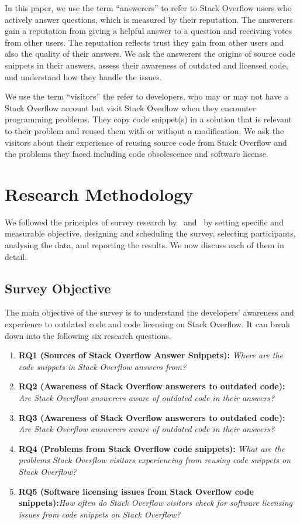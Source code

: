 \documentclass{svjour3}                     %
\begin{document}
In this paper, we use the term ``answerers'' to refer to Stack Overflow users
who actively answer questions, which is measured by their reputation. The
answerers gain a reputation from giving a helpful answer to a question and
receiving votes from other users. The reputation reflects trust they gain from
other users and also the quality of their answers. We ask the answerers the
origins of source code snippets in their answers, assess their awareness of
outdated and licensed code, and understand how they handle the issues.

We use the term ``visitors'' the refer to developers, who may or may not have a
Stack Overflow account but visit Stack Overflow when they encounter programming
problems. They copy code snippet(s) in a solution that is relevant to their
problem and reused them with or without a modification. We ask the visitors
about their experience of reusing source code from Stack Overflow and the problems
they faced including code obsolescence and software license.

\section{Research Methodology}
We followed the principles of survey research by~\cite{Pfleeger2001}
and~\cite{Kitchenham2002} by setting specific and measurable objective, 
designing and scheduling the survey, selecting participants, analysing the data, and reporting the results.
We now discuss each of them in detail.

\subsection{Survey Objective}
The main objective of the survey is to understand the developers' awareness and
experience to outdated code and code licensing on Stack Overflow. It can break
down into the following six research questions.

\begin{enumerate}
	\item \textbf{RQ1 (Sources of Stack Overflow Answer Snippets):} \textit{Where are the code snippets in Stack Overflow answers from?}
	\item \textbf{RQ2 (Awareness of Stack Overflow answerers to outdated code):} \textit{Are Stack Overflow answerers aware of outdated code in their answers?}
	\item \textbf{RQ3 (Awareness of Stack Overflow answerers to outdated code):} \textit{Are Stack Overflow answerers aware of outdated code in their answers?}
	\item \textbf{RQ4 (Problems from Stack Overflow code snippets):} \textit{What are the problems Stack Overflow visitors experiencing from reusing code snippets on Stack Overflow?}
	\item \textbf{RQ5 (Software licensing issues from Stack Overflow code snippets):}\textit{How often do Stack Overflow visitors check for software licensing issues from code snippets on Stack Overflow?}
\end{enumerate}
\end{document}
